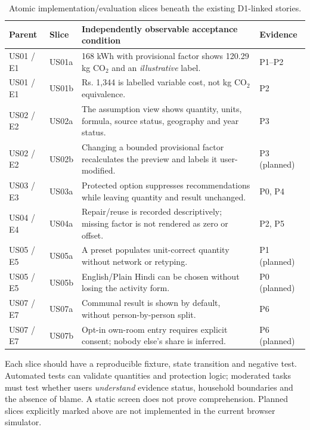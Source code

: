 \documentclass[12pt,a4paper]{article}
\begin{document}
\begin{table}[ht]
\centering\small
\caption{Atomic implementation/evaluation slices beneath the existing D1-linked stories.}
\label{tab:atomic-stories}
\begin{tabularx}{\textwidth}{@{}p{1.4cm}p{1.7cm}Xp{2.0cm}@{}}
\toprule
\textbf{Parent}&\textbf{Slice}&\textbf{Independently observable acceptance condition}&\textbf{Evidence}\\
\midrule
US01 / E1&US01a&168 kWh with provisional factor shows 120.29 kg CO$_2$ and an \emph{illustrative} label.&P1--P2\\
US01 / E1&US01b&Rs. 1,344 is labelled variable cost, not kg CO$_2$ equivalence.&P2\\
US02 / E2&US02a&The assumption view shows quantity, units, formula, source status, geography and year status.&P3\\
US02 / E2&US02b&Changing a bounded provisional factor recalculates the preview and labels it user-modified.&P3 (planned)\\
US03 / E3&US03a&Protected option suppresses recommendations while leaving quantity and result unchanged.&P0, P4\\
US04 / E4&US04a&Repair/reuse is recorded descriptively; missing factor is not rendered as zero or offset.&P2, P5\\
US05 / E5&US05a&A preset populates unit-correct quantity without network or retyping.&P1 (planned)\\
US05 / E5&US05b&English/Plain Hindi can be chosen without losing the activity form.&P0 (planned)\\
US07 / E7&US07a&Communal result is shown by default, without person-by-person split.&P6\\
US07 / E7&US07b&Opt-in own-room entry requires explicit consent; nobody else's share is inferred.&P6 (planned)\\
\bottomrule
\end{tabularx}
\end{table}

Each slice should have a reproducible fixture, state transition and negative test. Automated tests can validate quantities and protection logic; moderated tasks must test whether users \emph{understand} evidence status, household boundaries and the absence of blame. A static screen does not prove comprehension. Planned slices explicitly marked above are not implemented in the current browser simulator.
\end{document}
